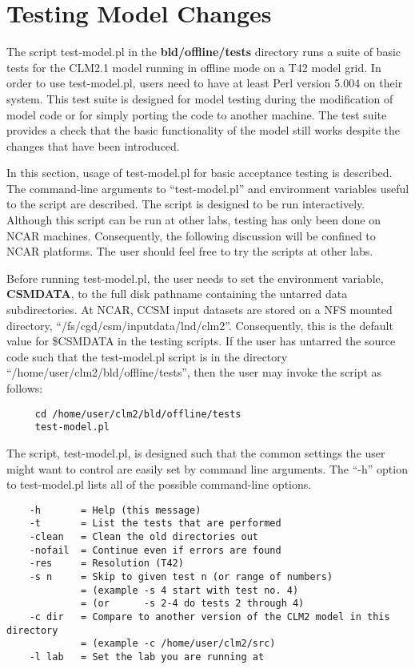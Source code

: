 \section {Testing Model Changes}

The script test-model.pl in the {\bf bld/offline/tests} directory runs
a suite of basic tests for the CLM2.1 model running in offline mode on
a T42 model grid.  In order to use test-model.pl, users need to
have at least Perl version 5.004 on their system.  This test suite is
designed for model testing during the modification of model code or
for simply porting the code to another machine. The test suite
provides a check that the basic functionality of the model still works
despite the changes that have been introduced.

In this section, usage of test-model.pl for basic acceptance testing
is described.  The command-line arguments to ``test-model.pl'' and
environment variables useful to the script are described. The script
is designed to be run interactively.  Although this script can be run
at other labs, testing has only been done on NCAR
machines. Consequently, the following discussion will be confined to
NCAR platforms. The user should feel free to try the scripts at other
labs.

Before running test-model.pl, the user needs to set the environment
variable, {\bf CSMDATA}, to the full disk pathname containing the
untarred data subdirectories.  At NCAR, CCSM input datasets are stored
on a NFS mounted directory,
``/fs/cgd/csm/inputdata/lnd/clm2''. Consequently, this is the default
value for \$CSMDATA in the testing scripts.  If the user has untarred
the source code such that the test-model.pl script is in the directory
``/home/user/clm2/bld/offline/tests'', then the user may invoke the
script as follows:\newline

\begin{verbatim}
     cd /home/user/clm2/bld/offline/tests 
     test-model.pl 
\end{verbatim}

The script, test-model.pl, is designed such that the common settings
the user might want to control are easily set by command line
arguments. The ``-h'' option to test-model.pl lists all of the
possible command-line options. 

\begin{verbatim}
    -h       = Help (this message) 
    -t       = List the tests that are performed  
    -clean   = Clean the old directories out   
    -nofail  = Continue even if errors are found   
    -res     = Resolution (T42)
    -s n     = Skip to given test n (or range of numbers)   
             = (example -s 4 start with test no. 4)   
             = (or      -s 2-4 do tests 2 through 4)   
    -c dir   = Compare to another version of the CLM2 model in this directory   
             = (example -c /home/user/clm2/src)  
    -l lab   = Set the lab you are running at    
\end{verbatim}

